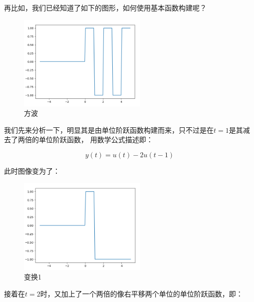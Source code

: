 \documentclass{ctexart}
\begin{document}
再比如，我们已经知道了如下的图形，如何使用基本函数构建呢？
\begin{figure}[H]
    \centering
    \includegraphics[width=0.55\textwidth]{./pics/deeply_understand_control_theory/square_wave.png}
    \caption{方波}
    \label{Fig.4}
\end{figure}

我们先来分析一下，明显其是由单位阶跃函数构建而来，只不过是在$t=1$是其减去了两倍的单位阶跃函数，
用数学公式描述即：

\begin{equation}
    y(t) = u(t) - 2u(t-1)
\end{equation}

此时图像变为了：

\begin{figure}[H]
    \centering
    \includegraphics[width=0.55\textwidth]{./pics/deeply_understand_control_theory/step_transform1.png}
    \caption{变换1}
    \label{Fig.5}
\end{figure}

接着在$t=2$时，又加上了一个两倍的像右平移两个单位的单位阶跃函数，即：
\end{document}
